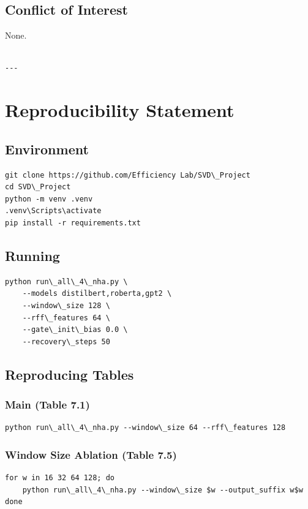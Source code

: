 \subsection{Conflict of Interest}

None.
\begin{lstlisting}

---
\end{lstlisting}


\section{Reproducibility Statement}

\subsection{Environment}

\begin{lstlisting}
git clone https://github.com/Efficiency Lab/SVD\_Project
cd SVD\_Project
python -m venv .venv
.venv\Scripts\activate
pip install -r requirements.txt
\end{lstlisting}

\subsection{Running}

\begin{lstlisting}
python run\_all\_4\_nha.py \
    --models distilbert,roberta,gpt2 \
    --window\_size 128 \
    --rff\_features 64 \
    --gate\_init\_bias 0.0 \
    --recovery\_steps 50
\end{lstlisting}

\subsection{Reproducing Tables}

\subsubsection{Main (Table 7.1)}
\begin{lstlisting}
python run\_all\_4\_nha.py --window\_size 64 --rff\_features 128
\end{lstlisting}

\subsubsection{Window Size Ablation (Table 7.5)}
\begin{lstlisting}
for w in 16 32 64 128; do
    python run\_all\_4\_nha.py --window\_size $w --output_suffix w$w
done
\end{lstlisting}

